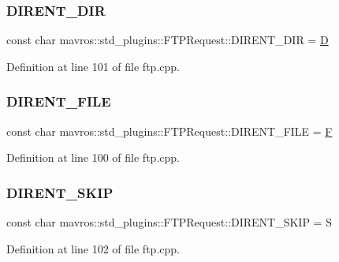 \subsubsection{\texorpdfstring{DIRENT\_DIR}{DIRENT\_DIR}}
{\footnotesize\ttfamily const char mavros\+::std\+\_\+plugins\+::\+F\+T\+P\+Request\+::\+D\+I\+R\+E\+N\+T\+\_\+\+D\+IR = \textquotesingle{}\mbox{\hyperlink{mavlink__sha256_8h_af316c33cc298530f245e8b55330e86b5}{D}}\textquotesingle{}\hspace{0.3cm}{\ttfamily [static]}}



Definition at line 101 of file ftp.\+cpp.

\mbox{\label{group__plugin_ga305f7ede1a81342461da0e6a5474b530}} 
\subsubsection{\texorpdfstring{DIRENT\_FILE}{DIRENT\_FILE}}
{\footnotesize\ttfamily const char mavros\+::std\+\_\+plugins\+::\+F\+T\+P\+Request\+::\+D\+I\+R\+E\+N\+T\+\_\+\+F\+I\+LE = \textquotesingle{}\mbox{\hyperlink{mavlink__sha256_8h_a42257a545daf5b7933d6e8f96adc74f2}{F}}\textquotesingle{}\hspace{0.3cm}{\ttfamily [static]}}



Definition at line 100 of file ftp.\+cpp.

\mbox{\label{group__plugin_ga5628fc53877a3f7a45b2ec1ec2a8652e}} 
\subsubsection{\texorpdfstring{DIRENT\_SKIP}{DIRENT\_SKIP}}
{\footnotesize\ttfamily const char mavros\+::std\+\_\+plugins\+::\+F\+T\+P\+Request\+::\+D\+I\+R\+E\+N\+T\+\_\+\+S\+K\+IP = \textquotesingle{}S\textquotesingle{}\hspace{0.3cm}{\ttfamily [static]}}



Definition at line 102 of file ftp.\+cpp.

\mbox{\label{group__plugin_gac9fd4b59474130b5bbc429fbbb5b6298}} 
